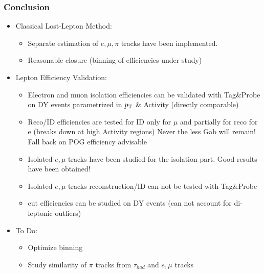 \documentclass{beamer}
\begin{document}
\begin{frame}
 \frametitle{Conclusion}
 
 \begin{itemize}
  \item Classical Lost-Lepton Method:
  \begin{itemize}
   \item Separate estimation of $e,\mu,\pi$ tracks have been implemented.
   \item Reasonable closure (binning of efficiencies under study)
  \end{itemize}
  \item Lepton Efficiency Validation:
  \begin{itemize}
   \item Electron and muon isolation efficiencies can be validated with Tag\&Probe on DY events parametrized in $p_{\text{T}}$ \& Activity (directly comparable)
   \item Reco/ID efficiencies are tested for ID only for $\mu$ and partially for reco for e (breaks down at high Activity regions) Never the less Gab will remain! Fall back on POG efficiency advisable
   \item Isolated $e,\mu$ tracks have been studied for the isolation part. Good results have been obtained!
   \item Isolated $e,\mu$ tracks reconstruction/ID can not be tested with Tag\&Probe
   \item \mt cut efficiencies can be studied on DY events (can not account for di-leptonic outliers)
  \end{itemize}
  \item To Do:
  \begin{itemize}
   \item Optimize binning
   \item Study similarity of $\pi$ tracks from $\tau_{had}$ and $e,\mu$ tracks
  \end{itemize}
 \end{itemize}

\end{frame}
\end{document}
